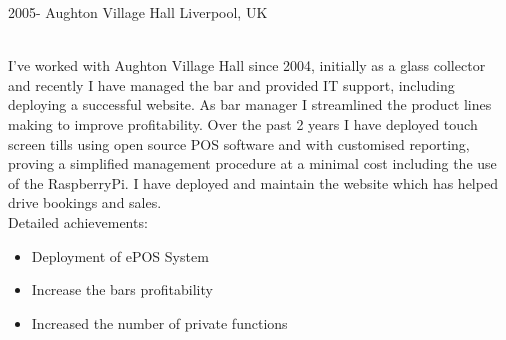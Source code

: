 \documentclass[]{cv-style}          %
\begin{document}
\begin{entrylist}
\entry
  {2005-}
  {Aughton Village Hall}
  {Liverpool, UK}
  {\\{I've worked with Aughton Village Hall since 2004, initially as a glass collector and recently I have managed the bar and provided IT support, including deploying a successful website. As bar manager I streamlined the product lines making to improve profitability. Over the past 2 years I have deployed touch screen tills using open source POS software and with customised reporting, proving a simplified management procedure at a minimal cost including the use of the RaspberryPi. I have deployed and maintain the website which has helped drive bookings and sales.\\}
    Detailed achievements:
  \begin{itemize}
    \item Deployment of ePOS System
    \item Increase the bars profitability
    \item Increased the number of private functions 
  \end{itemize}
}
\end{entrylist}






\end{document}
